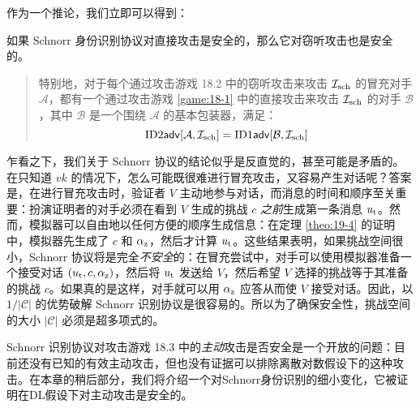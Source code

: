 作为一个推论，我们立即可以得到：

\begin{theorem}\label{theo:19-5}
	如果 Schnorr 身份识别协议对直接攻击是安全的，那么它对窃听攻击也是安全的。
	
	\begin{quote}
		特别地，对于每个通过攻击游戏 18.2 中的窃听攻击来攻击 $\mathcal{I}_{\rm sch}$ 的冒充对手 $\mathcal{A}$，都有一个通过攻击游戏 \ref{game:18-1} 中的直接攻击来攻击 $\mathcal{I}_{\rm sch}$ 的对手 $\mathcal{B}$，其中 $\mathcal{B}$ 是一个围绕 $\mathcal{A}$ 的基本包装器，满足：
		\[
		{\rm ID2\mathsf{adv}}[\mathcal{A},\mathcal{I}_{\rm sch}]=
		{\rm ID1\mathsf{adv}}[\mathcal{B},\mathcal{I}_{\rm sch}]
		\]
	\end{quote}
\end{theorem}

乍看之下，我们关于 Schnorr 协议的结论似乎是反直觉的，甚至可能是矛盾的。在只知道 $vk$ 的情况下，怎么可能既很难进行冒充攻击，又容易产生对话呢？答案是，在进行冒充攻击时，验证者 $V$ 主动地参与对话，而消息的时间和顺序至关重要：扮演证明者的对手必须在看到 $V$ 生成的挑战 $c$ \emph{之前}生成第一条消息 $u_{\rm t}$。然而，模拟器可以自由地以任何方便的顺序生成信息：在定理 \ref{theo:19-4} 的证明中，模拟器先生成了 $c$ 和 $\alpha_{\rm z}$，然后才计算 $u_{\rm t}$。这些结果表明，如果挑战空间很小，Schnorr 协议将是完全\emph{不安全}的：在冒充尝试中，对手可以使用模拟器准备一个接受对话 $(u_{\rm t},c,\alpha_{\rm z})$，然后将 $u_{\rm t}$ 发送给 $V$，然后希望 $V$ 选择的挑战等于其准备的挑战 $c$。如果真的是这样，对手就可以用 $\alpha_{\rm z}$ 应答从而使 $V$ 接受对话。因此，以 ${1}/{|\mathcal{C}|}$ 的优势破解 Schnorr 识别协议是很容易的。所以为了确保安全性，挑战空间的大小 $|\mathcal{C}|$ 必须是超多项式的。

Schnorr 识别协议对攻击游戏 18.3 中的\emph{主动}攻击是否安全是一个开放的问题：目前还没有已知的有效主动攻击，但也没有证据可以排除离散对数假设下的这种攻击。在本章的稍后部分，我们将介绍一个对Schnorr身份识别的细小变化，它被证明在DL假设下对主动攻击是安全的。